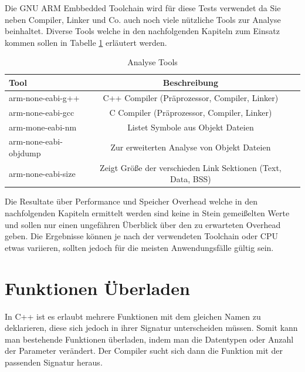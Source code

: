 \documentclass[MES,Master,ngerman]{twbook}%
\begin{document}
Die GNU ARM Embbedded Toolchain wird für diese Tests verwendet da Sie neben Compiler, Linker und Co. auch noch viele nützliche Tools zur Analyse beinhaltet. Diverse Tools welche in den nachfolgenden Kapiteln zum Einsatz kommen sollen in Tabelle \ref{tbl:analystools} erläutert werden.

\begin{table}[!htb]
	\centering
	\begin{tabular}{| l | c | r |}
		\hline
		\textbf{Tool}  & \textbf{Beschreibung} \\ \hline
		arm-none-eabi-g++           & C++ Compiler (Präprozessor, Compiler, Linker) \\ \hline
		arm-none-eabi-gcc       	& C	  Compiler (Präprozessor, Compiler, Linker) \\ \hline
		arm-mone-eabi-nm        	& Listet Symbole aus Objekt Dateien \\ \hline
		arm-none-eabi-objdump		& Zur erweiterten Analyse von Objekt Dateien \\ \hline
		arm-none-eabi-size			& Zeigt Größe der verschieden Link Sektionen (Text, Data, BSS) \\ \hline
	\end{tabular}
	
	\caption{Analyse Tools}
	\label{tbl:analystools}
	
\end{table}

Die Resultate über Performance und Speicher Overhead welche in den nachfolgenden Kapiteln ermittelt werden sind keine in Stein gemeißelten Werte und sollen nur einen ungefähren Überblick über den zu erwarteten Overhead geben. Die Ergebnisse können je nach der verwendeten Toolchain oder CPU etwas variieren, sollten jedoch für die meisten Anwendungsfälle gültig sein.


\newpage
\section{Funktionen Überladen}
In C++ ist es erlaubt mehrere Funktionen mit dem gleichen Namen zu deklarieren, diese sich jedoch in ihrer Signatur unterscheiden müssen. Somit kann man bestehende Funktionen überladen, indem man die Datentypen oder Anzahl der Parameter verändert. Der Compiler sucht sich dann die Funktion mit der passenden Signatur heraus. 
\end{document}
